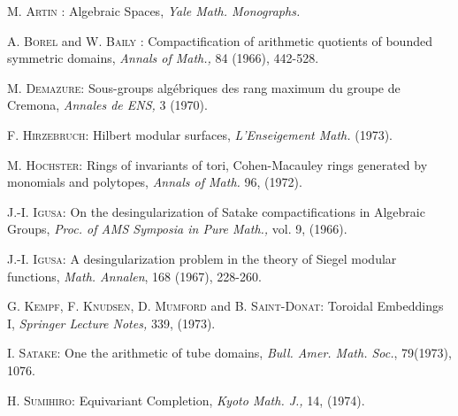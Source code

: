 \begin{thebibliography}{99}
 \textsc{M. Artin :} Algebraic Spaces, \textit{Yale Math. Monographs.}

 \textsc{A. Borel} and \textsc{W. Baily :} Compactification of arithmetic quotients of bounded symmetric domains, \textit{Annals of Math.,} 84 (1966), 442-528.

 \textsc{M. Demazure:} Sous-groups alg\'ebriques des rang maximum du groupe de Cremona, \textit{Annales de ENS,} 3 (1970).

  \textsc{F. Hirzebruch:} Hilbert modular surfaces, \textit{L'Enseigement Math.} (1973).

  \textsc{M. Hochster:} Rings of invariants of tori, Cohen-Macauley rings generated by monomials and polytopes, \textit{Annals of Math.} 96, (1972).

  \textsc{J.-I. Igusa:} On the desingularization of Satake compactifications in Algebraic Groups, \textit{Proc. of AMS Symposia in Pure Math.,} vol. 9, (1966).

  \textsc{J.-I. Igusa:} A desingularization problem in the theory of Siegel modular functions, \textit{Math. Annalen}, 168 (1967), 228-260.

  \textsc{G. Kempf, F. Knudsen, D. Mumford} and \textsc{B. Saint-Donat:} Toroidal Embeddings I, \textit{Springer Lecture Notes,} 339, (1973).

  \textsc{I. Satake:} One the arithmetic of tube domains, \textit{Bull. Amer. Math. Soc.}, 79(1973), 1076.

  \textsc{H. Sumihiro:} Equivariant Completion, \textit{Kyoto Math. J.,} 14, (1974).
\end{thebibliography}

